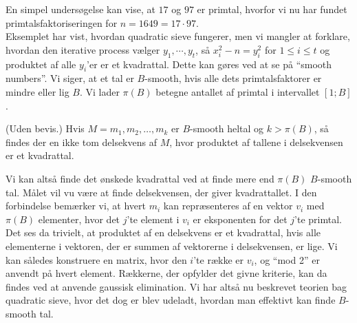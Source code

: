 En simpel undersøgelse kan vise, at $17$ og $97$ er primtal, hvorfor vi nu har fundet
primtalsfaktoriseringen for $n = 1649 = 17 \cdot 97$.\\
Eksemplet har vist, hvordan quadratic sieve fungerer, men vi mangler at forklare,
hvordan den iterative process vælger $y_1,\cdots,y_t$, så $x_i^2 - n = y_i^2$
for $1 \le i \le t$ og produktet af alle $y_i$'er er et kvadrattal.
Dette kan gøres ved at se på ``smooth numbers''. Vi siger, at et tal er $B$-smooth,
hvis alle dets primtalsfaktorer er mindre eller lig $B$. Vi lader $\pi(B)$ betegne
antallet af primtal i intervallet $[1 ; B]$.
\begin{lemma}
(Uden bevis.) Hvis $M = m_1, m_2, \dots, m_k$ er $B$-smooth heltal og $k > \pi(B)$, så findes der
en ikke tom delsekvens af $M$, hvor produktet af tallene i delsekvensen er et kvadrattal.
\end{lemma}
Vi kan altså finde det ønskede kvadrattal ved at finde mere end $\pi(B)$ $B$-smooth
tal. Målet vil vu være at finde delsekvensen, der giver kvadrattallet. I den forbindelse
bemærker vi, at hvert $m_i$ kan repræsenteres af en vektor $v_i$ med $\pi(B)$ elementer,
hvor det $j$'te element i $v_i$ er eksponenten for det $j$'te primtal. Det ses da trivielt,
at produktet af en delsekvens er et kvadrattal, hvis alle elementerne i vektoren, der
er summen af vektorerne i delsekvensen, er lige. Vi kan således konstruere en matrix, hvor
den $i$'te række er $v_i$, og ``mod 2'' er anvendt på hvert element. Rækkerne,
der opfylder det givne kriterie, kan da findes ved at anvende gaussisk elimination.
Vi har altså nu beskrevet teorien bag quadratic sieve, hvor det dog er blev udeladt,
hvordan man effektivt kan finde $B$-smooth tal.
